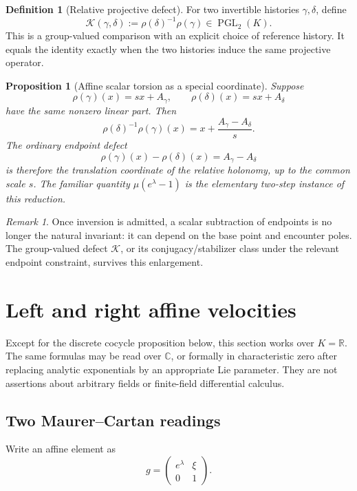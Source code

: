 \documentclass[11pt]{article}
\newtheorem{proposition}[theorem]{Proposition}
\theoremstyle{definition}
\newtheorem{definition}[theorem]{Definition}
\theoremstyle{remark}
\newtheorem{remark}[theorem]{Remark}
\newcommand{\PGL}{\operatorname{PGL}}
\begin{document}
\begin{definition}[Relative projective defect]
For two invertible histories \(\gamma,\delta\), define
\[
\mathcal K(\gamma,\delta)
:=
\rho(\delta)^{-1}\rho(\gamma)
\in\PGL_2(K).
\]
This is a group-valued comparison with an explicit choice of reference
history.  It equals the identity exactly when the two histories induce the
same projective operator.
\end{definition}

\begin{proposition}[Affine scalar torsion as a special coordinate]
Suppose
\[
\rho(\gamma)(x)=sx+A_\gamma,\qquad
\rho(\delta)(x)=sx+A_\delta
\]
have the same nonzero linear part.  Then
\[
\rho(\delta)^{-1}\rho(\gamma)(x)
=x+\frac{A_\gamma-A_\delta}{s}.
\]
The ordinary endpoint defect
\[
\rho(\gamma)(x)-\rho(\delta)(x)=A_\gamma-A_\delta
\]
is therefore the translation coordinate of the relative holonomy, up to the
common scale \(s\).  The familiar quantity
\(\mu(e^\lambda-1)\) is the elementary two-step instance of this reduction.
\end{proposition}

\begin{remark}
Once inversion is admitted, a scalar subtraction of endpoints is no longer
the natural invariant: it can depend on the base point and encounter poles.
The group-valued defect \(\mathcal K\), or its conjugacy/stabilizer class under
the relevant endpoint constraint, survives this enlargement.
\end{remark}

\section{Left and right affine velocities}

Except for the discrete cocycle proposition below, this section works over
\(K=\mathbb R\).  The same formulas may be read over \(\mathbb C\), or
formally in characteristic zero after replacing analytic exponentials by an
appropriate Lie parameter.  They are not assertions about arbitrary fields
or finite-field differential calculus.

\subsection{Two Maurer--Cartan readings}

Write an affine element as
\[
g=
\begin{pmatrix}
e^\lambda&\xi\\
0&1
\end{pmatrix}.
\]
\end{document}
